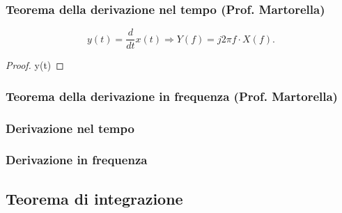 \documentclass[12pt,oneside,openany]{memoir}
\numberwithin{equation}{subsection}
\begin{document}

\subsubsection{Teorema della derivazione nel tempo (Prof. Martorella)}
\[
    y(t) = \frac{d}{dt} x(t) \Longrightarrow Y(f) = j 2 \pi f \cdot X(f).
\]
\begin{proof}
    y(t) 
\end{proof}

\subsubsection{Teorema della derivazione in frequenza (Prof. Martorella)}


\newpage
\subsubsection{Derivazione nel tempo}


\newpage
\subsubsection{Derivazione in frequenza}


\newpage
\subsection{Teorema di integrazione}
\end{document}
